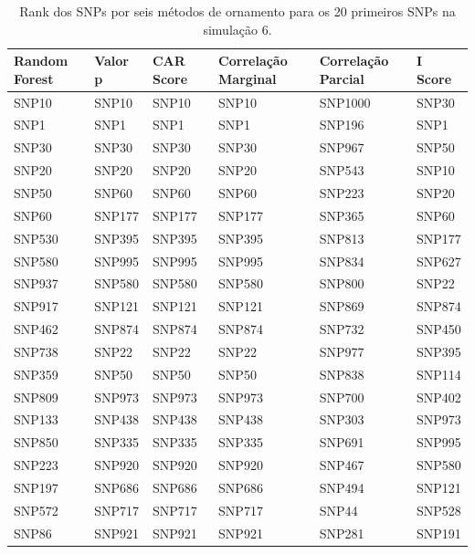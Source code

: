 \begin{table}[ht]
\centering
\begin{tabular}{llllll}
  \hline
Random Forest & Valor p & CAR Score & Correlação Marginal & Correlação Parcial & I Score \\ 
  \hline
SNP10 & SNP10 & SNP10 & SNP10 & SNP1000 & SNP30 \\ 
  SNP1 & SNP1 & SNP1 & SNP1 & SNP196 & SNP1 \\ 
  SNP30 & SNP30 & SNP30 & SNP30 & SNP967 & SNP50 \\ 
  SNP20 & SNP20 & SNP20 & SNP20 & SNP543 & SNP10 \\ 
  SNP50 & SNP60 & SNP60 & SNP60 & SNP223 & SNP20 \\ 
  SNP60 & SNP177 & SNP177 & SNP177 & SNP365 & SNP60 \\ 
  SNP530 & SNP395 & SNP395 & SNP395 & SNP813 & SNP177 \\ 
  SNP580 & SNP995 & SNP995 & SNP995 & SNP834 & SNP627 \\ 
  SNP937 & SNP580 & SNP580 & SNP580 & SNP800 & SNP22 \\ 
  SNP917 & SNP121 & SNP121 & SNP121 & SNP869 & SNP874 \\ 
  SNP462 & SNP874 & SNP874 & SNP874 & SNP732 & SNP450 \\ 
  SNP738 & SNP22 & SNP22 & SNP22 & SNP977 & SNP395 \\ 
  SNP359 & SNP50 & SNP50 & SNP50 & SNP838 & SNP114 \\ 
  SNP809 & SNP973 & SNP973 & SNP973 & SNP700 & SNP402 \\ 
  SNP133 & SNP438 & SNP438 & SNP438 & SNP303 & SNP973 \\ 
  SNP850 & SNP335 & SNP335 & SNP335 & SNP691 & SNP995 \\ 
  SNP223 & SNP920 & SNP920 & SNP920 & SNP467 & SNP580 \\ 
  SNP197 & SNP686 & SNP686 & SNP686 & SNP494 & SNP121 \\ 
  SNP572 & SNP717 & SNP717 & SNP717 & SNP44 & SNP528 \\ 
  SNP86 & SNP921 & SNP921 & SNP921 & SNP281 & SNP191 \\ 
   \hline
\end{tabular}
\caption{Rank dos SNPs por seis métodos de ornamento para os 20 primeiros SNPs na simulação 6.} 
\label{tab:ranks}
\end{table}

